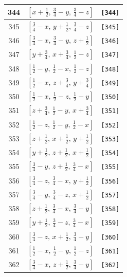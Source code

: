 \documentclass[fleqn,8pt]{jsarticle}
\begin{document}
\begin{longtable}{ccc}
344 & $\left[ x + \frac{1}{2},\, \frac{3}{4} - y,\, \frac{3}{4} - z \right]$ & {\tt [344]} \\ \hline
345 & $\left[ \frac{3}{4} - x,\, y + \frac{1}{2},\, \frac{3}{4} - z \right]$ & {\tt [345]} \\ \hline
346 & $\left[ \frac{3}{4} - x,\, \frac{3}{4} - y,\, z + \frac{1}{2} \right]$ & {\tt [346]} \\ \hline
347 & $\left[ y + \frac{3}{4},\, x + \frac{3}{4},\, \frac{1}{2} - z \right]$ & {\tt [347]} \\ \hline
348 & $\left[ \frac{1}{2} - y,\, \frac{1}{2} - x,\, \frac{1}{2} - z \right]$ & {\tt [348]} \\ \hline
349 & $\left[ \frac{1}{2} - x,\, z + \frac{3}{4},\, y + \frac{3}{4} \right]$ & {\tt [349]} \\ \hline
350 & $\left[ \frac{1}{2} - x,\, \frac{1}{2} - z,\, \frac{1}{2} - y \right]$ & {\tt [350]} \\ \hline
351 & $\left[ z + \frac{3}{4},\, \frac{1}{2} - y,\, x + \frac{3}{4} \right]$ & {\tt [351]} \\ \hline
352 & $\left[ \frac{1}{2} - z,\, \frac{1}{2} - y,\, \frac{1}{2} - x \right]$ & {\tt [352]} \\ \hline
353 & $\left[ z + \frac{1}{2},\, x + \frac{1}{2},\, y + \frac{1}{2} \right]$ & {\tt [353]} \\ \hline
354 & $\left[ y + \frac{1}{2},\, z + \frac{1}{2},\, x + \frac{1}{2} \right]$ & {\tt [354]} \\ \hline
355 & $\left[ \frac{3}{4} - y,\, z + \frac{1}{2},\, \frac{3}{4} - x \right]$ & {\tt [355]} \\ \hline
356 & $\left[ \frac{3}{4} - z,\, \frac{3}{4} - x,\, y + \frac{1}{2} \right]$ & {\tt [356]} \\ \hline
357 & $\left[ \frac{3}{4} - y,\, \frac{3}{4} - z,\, x + \frac{1}{2} \right]$ & {\tt [357]} \\ \hline
358 & $\left[ z + \frac{1}{2},\, \frac{3}{4} - x,\, \frac{3}{4} - y \right]$ & {\tt [358]} \\ \hline
359 & $\left[ y + \frac{1}{2},\, \frac{3}{4} - z,\, \frac{3}{4} - x \right]$ & {\tt [359]} \\ \hline
360 & $\left[ \frac{3}{4} - z,\, x + \frac{1}{2},\, \frac{3}{4} - y \right]$ & {\tt [360]} \\ \hline
361 & $\left[ \frac{1}{2} - x,\, \frac{1}{2} - y,\, \frac{1}{2} - z \right]$ & {\tt [361]} \\ \hline
362 & $\left[ \frac{3}{4} - x,\, z + \frac{1}{2},\, \frac{3}{4} - y \right]$ & {\tt [362]} \\ \hline

\end{longtable}
\end{document}
